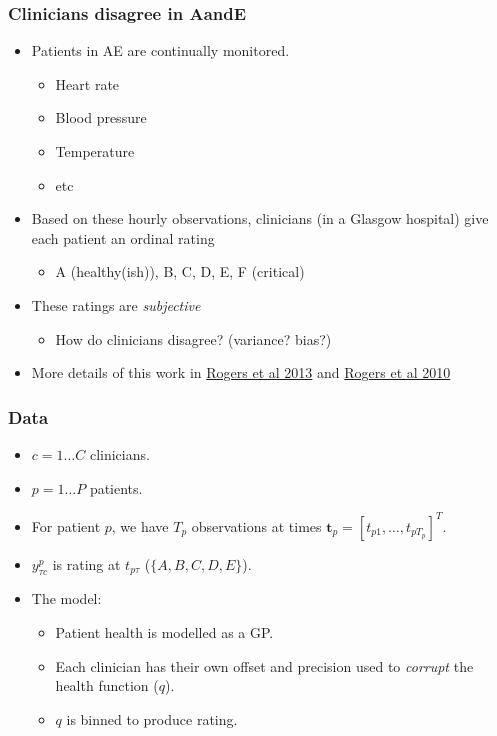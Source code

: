 

\begin{frame}
	\frametitle{Clinicians disagree in AandE}
	\begin{itemize}
		\item Patients in \ac{AE} are continually monitored.
		\begin{itemize}
			\item Heart rate
			\item Blood pressure
			\item Temperature
			\item etc
		\end{itemize}
		\item<2-> Based on these hourly observations, clinicians (in a Glasgow hospital) give each patient an ordinal rating
		\begin{itemize}
			\item A (healthy(ish)), B, C, D, E, F (critical)
		\end{itemize}
		\item<3->These ratings are \emph{subjective}
		\begin{itemize}
			\item How do clinicians disagree? (variance? bias?)
		\end{itemize}
		\item<3->More details of this work in \href{http://dx.doi.org/10.1109/JBHI.2013.2252182}{Rogers et al 2013} and \href{http://dx.doi.org/10.1007/s11222-009-9125-z}{Rogers et al 2010}
	\end{itemize}
\end{frame}

\begin{frame}
	\frametitle{Data}
	\begin{itemize}
		\item $c = 1\ldots C$ clinicians.
		\item $p=1\ldots P$ patients.
		\item For patient $p$, we have $T_p$ observations at times $\mathbf{t}_p = [t_{p1},\ldots,t_{pT_p}]^T$.
		\item $y_{\tau c}^p$ is rating at $t_{p\tau}$ ($\{A,B,C,D,E\}$).
		\item The model:
		\begin{itemize}
			\item Patient health is modelled as a GP.
			\item Each clinician has their own offset and precision used to \emph{corrupt} the health function ($q$).
			\item $q$ is binned to produce rating.
		\end{itemize}
	\end{itemize}
\end{frame}

